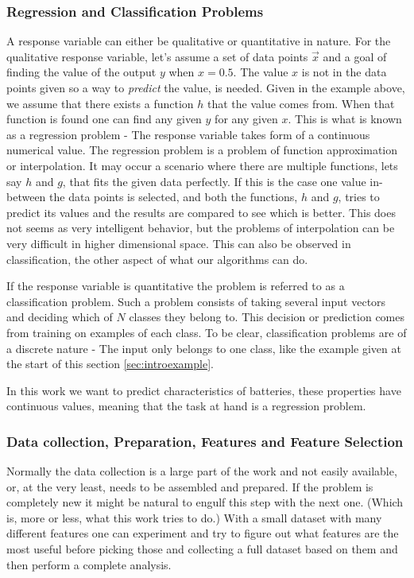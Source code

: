 	\subsubsection{Regression and Classification Problems}
		A response variable can either be qualitative or quantitative in nature. For the qualitative response variable, let's assume a set of data points $ \vec{x}$ and a goal of finding the value of the output $y$ when $x = 0.5$. The value $x $ is not in the data points given so a way to \textit{predict} the value, is needed. Given in the example above, we assume that there exists a function $h$ that the value comes from. When that function is found one can find any given $y$ for any given $x$. This is what is known as a regression problem - The response variable takes form of a continuous numerical value. The regression problem is a problem of function approximation or interpolation. It may occur a scenario where there are multiple functions, lets say $h$ and $g$, that fits the given data perfectly. If this is the case one value in-between the data points is selected, and both the functions, $h$ and $g$, tries to predict its values and the results are compared to see which is better.
	This does not seems as very intelligent behavior, but the problems of interpolation can be very difficult in higher dimensional space. This can also be observed in classification, the other aspect of what our algorithms can do.  
	
	If the response variable is quantitative the problem is referred to as a classification problem. Such a problem consists of taking several input vectors and deciding which of $N$ classes they belong to. This decision or prediction comes from training on examples of each class. To be clear, classification problems are of a discrete nature - The input only belongs to one class, like the example given at the start of this section \ref{sec:introexample}.
	
	In this work we want to predict characteristics of batteries, these properties have continuous values, meaning that the task at hand is a regression problem.
	
	\subsubsection{Data collection, Preparation, Features and Feature Selection}
	 
	Normally the data collection is a large part of the work and not easily available, or, at the very least, needs to be assembled and prepared. If the problem is completely new it might be natural to engulf this step with the next one. (Which is, more or less, what this work tries to do.) With a small dataset with many different features one can experiment and try to figure out what features are the most useful before picking those and collecting a full dataset based on them and then perform a complete analysis. 
	
